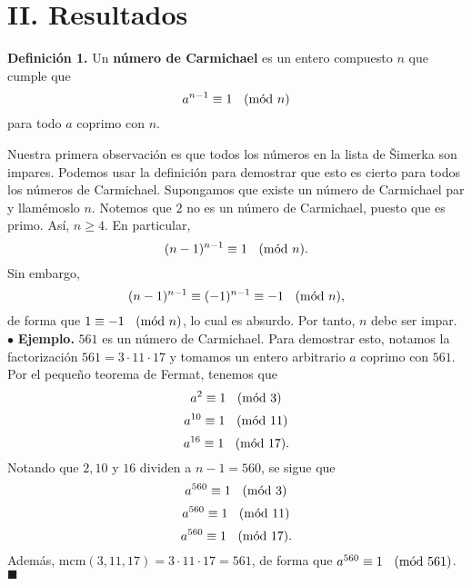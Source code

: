 \documentclass{article}
\theoremstyle{definition}
\newcommand{\Mod}[1]{\ \hspace{0.2cm} (\mathrm{m\acute{o}d}\ #1)}
\begin{document}
\section*{II. Resultados}
\vspace{0.5cm}
\begin{mybox1}
	\textbf{Definición 1. } Un  \textbf{número de Carmichael} es un entero compuesto $n$ que cumple que  
	$$ a^{n-1} \equiv 1 \Mod{n} $$
	para todo $a$ coprimo con $n$.
\end{mybox1}	
\vspace{0.5cm}
Nuestra primera observación es que todos los números en la lista de Šimerka son impares. Podemos usar la definición para demostrar que esto es cierto para todos los números de Carmichael.  Supongamos que existe un número de Carmichael par y llamémoslo $n$. Notemos que $2$ no es un número de Carmichael, puesto que es primo. Así, $n \geq 4$. En particular, 
$$ (n-1)^{n-1} \equiv 1 \Mod{n} .$$
Sin embargo, 
$$ (n-1)^{n-1} \equiv (-1)^{n-1} \equiv -1 \Mod{n}  ,$$
de forma que $ 1 \equiv -1 \Mod{n}$, lo cual es absurdo. Por tanto, $n$ debe ser impar. \\

$\bullet$ \textbf{Ejemplo.} $561$ es un número de Carmichael. Para demostrar esto, notamos la factorización $561 = 3 \cdot 11 \cdot 17$ y tomamos un entero arbitrario $a$ coprimo con $561$. Por el pequeño teorema de Fermat, tenemos que
$$ a^2 \equiv 1 \Mod{3} $$
$$ a^{10} \equiv 1 \Mod{11} $$
$$ a^{16} \equiv 1 \Mod{17}. $$
Notando que $2, 10$ y $16$ dividen a $n - 1 = 560$, se sigue que
$$ a^{560} \equiv 1 \Mod{3} $$
$$ a^{560} \equiv 1 \Mod{11} $$
$$ a^{560} \equiv 1 \Mod{17}. $$
Además, $\text{mcm}(3, 11, 17) = 3 \cdot 11 \cdot 17 = 561$, de forma que $a^{560} \equiv 1 \Mod{561}$. \hspace{2cm}$\blacksquare$ \\
\end{document}
